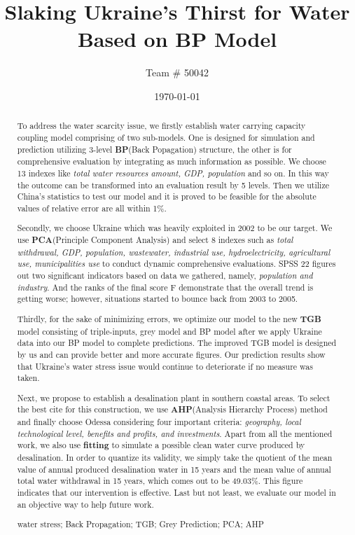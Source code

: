 \documentclass[a4paper,11pt]{article}
\title{Slaking Ukraine's Thirst for Water Based on BP Model}
\author{\small  Team \# 50042 }
\date{\today}
\begin{document}
\begin{abstract}
To address the water scarcity issue, we firstly establish water carrying capacity coupling model comprising of two sub-models. One is designed for simulation and prediction utilizing 3-level \textbf{BP}(Back Popagation) structure, the other is for comprehensive evaluation by integrating as much information as possible. We choose 13 indexes like \textit{total water resources amount, GDP, population} and so on. In this way the outcome can be transformed into an evaluation result by 5 levels. Then we utilize China's statistics to test our model and it is proved to be feasible for the absolute values of relative error are all within 1\%.

Secondly, we choose Ukraine which was heavily exploited in 2002 to be our target. We use \textbf{PCA}(Principle Component Analysis) and select 8 indexes such as \textit{total withdrawal, GDP, population, wastewater, industrial use, hydroelectricity, agricultural use, municipalities use} to conduct dynamic comprehensive evaluations. SPSS 22 figures out two significant indicators based on data we gathered, namely, \textit{population and industry}. And the ranks of the final score F demonstrate that the overall trend is getting worse; however, situations started to bounce back from 2003 to 2005.

Thirdly, for the sake of minimizing errors, we optimize our model to the new \textbf{TGB} model consisting of triple-inputs, grey model and BP model after we apply Ukraine data into our BP model to complete predictions. The improved TGB model is designed by us and can provide better and more accurate figures. Our prediction results show that Ukraine's water stress issue would continue to deteriorate if no measure was taken.

Next, we propose to establish a desalination plant in southern coastal areas. To select the best cite for this construction, we use \textbf{AHP}(Analysis Hierarchy Process) method and finally choose Odessa considering four important criteria: \textit{geography, local technological level, benefits and profits, and investments}. Apart from all the mentioned work, we also use \textbf{fitting} to simulate a possible clean water curve produced by desalination. In order to quantize its validity, we simply take the quotient of the mean value of annual produced desalination water in 15 years and the mean value of annual total water withdrawal in 15 years, which comes out to be 49.03\%. This figure indicates that our intervention is effective. Last but not least, we evaluate our model in an objective way to help future work.

\begin{keywords}
water stress; Back Propagation; TGB; Grey Prediction; PCA; AHP
\end{keywords}
\end{abstract}
\end{document}
